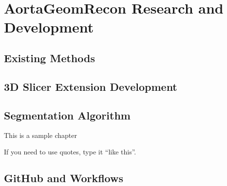 \chapter{AortaGeomRecon Research and Development}

\section{Existing Methods}

\section{3D Slicer Extension Development}

\section{Segmentation Algorithm}

This is a sample chapter

If you need to use quotes, type it ``like this''.

\section{GitHub and Workflows}

